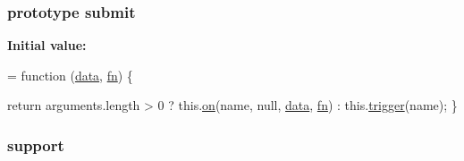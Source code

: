 \subsubsection[{\texorpdfstring{submit}{submit}}]{ {\bf prototype} submit}\hypertarget{jquery-2_82_81-vsdoc_8js_a58af54f4f7137a051db7e3e27bdfe1b5}{}\label{jquery-2_82_81-vsdoc_8js_a58af54f4f7137a051db7e3e27bdfe1b5}
{\bfseries Initial value\+:}
\begin{DoxyCode}
= \textcolor{keyword}{function} (\hyperlink{jquery-2_82_81-vsdoc_8js_a609407b3456fdc3c5671a9fc4a226ff7}{data}, \hyperlink{jquery-2_82_81-vsdoc_8js_acef6bdaf6b9b20fdcca1ea86f0902c3b}{fn}) \{
        

        \textcolor{keywordflow}{return} arguments.length > 0 ?
            this.\hyperlink{jquery-2_82_81-vsdoc_8js_ae453b412b883f60220d73468ef6c6dbc}{on}(name, null, \hyperlink{jquery-2_82_81-vsdoc_8js_a609407b3456fdc3c5671a9fc4a226ff7}{data}, \hyperlink{jquery-2_82_81-vsdoc_8js_acef6bdaf6b9b20fdcca1ea86f0902c3b}{fn}) :
            this.\hyperlink{jquery-2_82_81-vsdoc_8js_a2388c4114d5e3e4eab020f973641519c}{trigger}(name);
    \}
\end{DoxyCode}
\subsubsection[{\texorpdfstring{support}{support}}]{ support}\hypertarget{jquery-2_82_81-vsdoc_8js_a1be69652377630fc5432ae5ec6463744}{}\label{jquery-2_82_81-vsdoc_8js_a1be69652377630fc5432ae5ec6463744}
